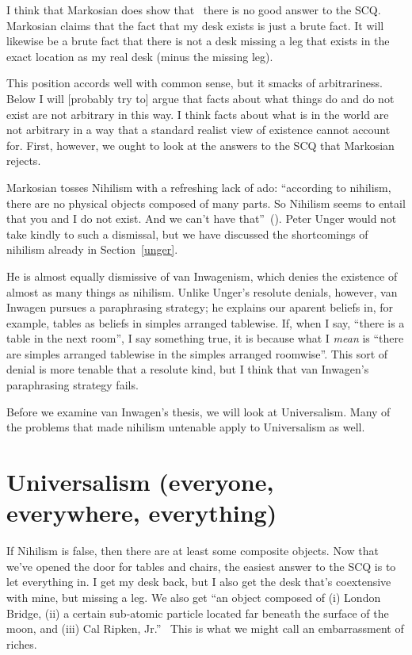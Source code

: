 \documentclass[11pt]{article}
\begin{document}
\begin{spacing}{1.5}
I think that Markosian does show that%
%
\ there is no good answer to the SCQ. Markosian claims that the fact that my desk exists is just a brute fact. It will likewise be a brute fact that there is not a desk missing a leg that exists in the exact location as my real desk (minus the missing leg).

This position accords well with common sense, but it smacks of arbitrariness. Below I will [probably try to] argue that facts about what things do and do not exist are not arbitrary in this way. I think facts about what is in the world are not arbitrary in a way that a standard realist view of existence cannot account for. First, however, we ought to look at the answers to the SCQ that Markosian rejects.

Markosian tosses Nihilism with a refreshing lack of ado: ``according to nihilism, there are no physical objects composed of many parts. So Nihilism seems to entail that you and I do not exist. And we can't have that''~(\citeyear[220]{markosian1998a}). Peter Unger would not take kindly to such a dismissal, but we have discussed the shortcomings of nihilism already in Section~\ref{unger}.

He is almost equally dismissive of van Inwagenism, which denies the existence of almost as many things as nihilism. Unlike Unger's resolute denials, however, van Inwagen pursues a paraphrasing strategy; he explains our aparent beliefs in, for example, tables as beliefs in simples arranged tablewise. If, when I say, ``there is a table in the next room'', I say something true, it is because what I {\em mean} is ``there are simples arranged tablewise in the simples arranged roomwise''. This sort of denial is more tenable that a resolute kind, but I think that van Inwagen's paraphrasing strategy fails.

Before we examine van Inwagen's thesis, we will look at Universalism. Many of the problems that made nihilism untenable apply to Universalism as well.

\section{Universalism (everyone, everywhere, everything)}
If Nihilism is false, then there are at least some composite objects. Now that we've opened the door for tables and chairs, the easiest answer to the SCQ is to let everything in. I get my desk back, but I also get the desk that's coextensive with mine, but missing a leg. We also get ``an object composed of (i) London Bridge, (ii) a certain sub-atomic particle located far beneath the surface of the moon, and (iii) Cal Ripken, Jr.''~\citep[228]{markosian1998a} %
This is what we might call an embarrassment of riches.


\end{spacing}
\end{document}
